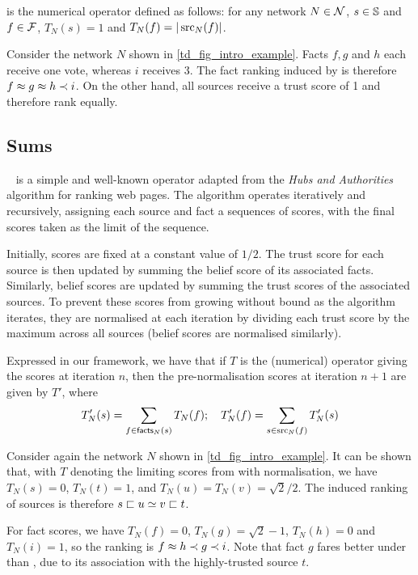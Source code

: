 \begin{definition}
\voting{} is the numerical operator defined as follows: for any network $N \in
\N$, $s \in \S$ and $f \in \F$, $T_N(s) = 1$ and $T_N(f) = |\src_N(f)|$.
\end{definition}

Consider the network $N$ shown in \cref{td_fig_intro_example}. Facts $f,
g$ and $h$ each receive one vote, whereas $i$ receives 3. The fact ranking
induced by \voting{} is therefore $f \feq g \feq h \flt i$.
On the other hand, all sources receive a trust score of 1 and therefore rank
equally.

\subsection{Sums}
\label{td_sec_sums_example}

\sums{}~\cite{pasternack2010} is a simple and well-known operator adapted from
the \emph{Hubs and Authorities}~\cite{kleinberg1999} algorithm for ranking web
pages. The algorithm operates iteratively and recursively, assigning each
source and fact a sequences of scores, with the final scores taken as the limit
of the sequence.

Initially, scores are fixed at a constant value of $1/2$. The trust score for
each source is then updated by summing the belief score of its associated
facts. Similarly, belief scores are updated by summing the trust scores of the
associated sources. To prevent these scores from growing without bound as the
algorithm iterates, they are normalised at each iteration by dividing each
trust score by the maximum across all sources (belief scores are normalised
similarly).

Expressed in our framework, we have that if $T$ is the (numerical) operator
giving the scores at iteration $n$, then the pre-normalisation scores at
iteration $n+1$ are given by $T'$, where
\begin{equation}
\label{td_eqn_sums_defn}
    T'_N(s) = \sum_{f \in \facts_N(s)}{T_N(f)};
    \quad
    T'_N(f) = \sum_{s \in \src_N(f)}{T'_N(s)}
\end{equation}

Consider again the network $N$ shown in \cref{td_fig_intro_example}. It can be
shown that, with $T$ denoting the limiting scores from \sums{} with
normalisation, we have $T_N(s) = 0$, $T_N(t) = 1$, and $T_N(u) = T_N(v) =
\sqrt{2} / 2$. The induced ranking of sources is therefore $s \slt u \seq v
\slt t$.

For fact scores, we have $T_N(f) = 0$, $T_N(g) = \sqrt{2} - 1$,
$T_N(h) = 0$ and $T_N(i) = 1$, so the ranking is $f \feq h \flt g \flt i$. Note
that fact $g$ fares better under \sums{} than \voting{}, due to its association
with the highly-trusted source $t$.

